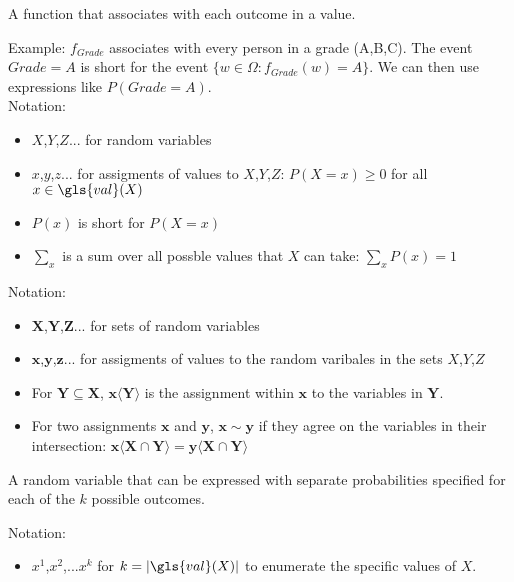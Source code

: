 {%
  A function that associates with each outcome in  a value.

  Example: $f_{Grade}$ associates with every person in  a grade (A,B,C). The event $Grade=A$ is short for the event $\{w\in\Omega:f_{Grade}(w)=A\}$. We can then use expressions like $P(Grade=A)$.\\

  Notation:
  \begin{itemize}
    \item $X$,$Y$,$Z$... for random variables
    \item $x$,$y$,$z$... for assigments of values to  $X$,$Y$,$Z$: $P(X=x)\geq0 $ for all $x\in \gls{val}(X)$
    \item $P(x)$ is short for $P(X=x)$
    \item $\sum_x$ is a sum over all possble values that $X$ can take: $\sum_xP(x)=1$
  \end{itemize}
}

{%
  Notation:
  \begin{itemize}
    \item $\bm{X}$,$\bm{Y}$,$\bm{Z}$... for sets of \glspl{random variable}
    \item $\bm{x}$,$\bm{y}$,$\bm{z}$... for assigments of values to the random varibales in the sets $X$,$Y$,$Z$
    \item For $\bm{Y}\subseteq \bm{X}$, $\bm{x}\langle \bm{Y}\rangle$ is the assignment within $\bm{x}$ to the variables in $\bm{Y}$.
    \item For two assignments $\bm{x}$ and $\bm{y}$, $\bm{x}\sim \bm{y}$ if they agree on the variables in their intersection: $\bm{x}\langle\bm{X}\cap\bm{Y}\rangle=\bm{y}\langle\bm{X}\cap\bm{Y}\rangle$
  \end{itemize}
}

{%
  A \gls{random variable} that can be expressed with separate probabilities specified for each of the $k$ possible outcomes.

  Notation:
  \begin{itemize}
    \item $x^1$,$x^2$,...$x^k$ for $k=\lvert\gls{val}(X)\rvert$ to enumerate the specific values of $X$.
  \end{itemize}
}

